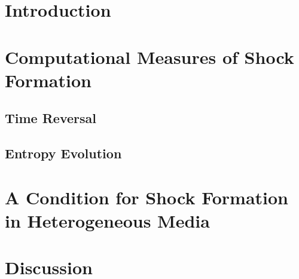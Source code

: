 \documentclass{cmslatex}
\begin{document}
\section{Introduction\label{intro}}


%  

\section{Computational Measures of Shock Formation\label{measures}}
  
  \subsection{Time Reversal}
    
  \subsection{Entropy Evolution}
    

\section{A Condition for Shock Formation in Heterogeneous Media\label{criterion}}
    

\section{Discussion\label{discussion}}
  


\end{document}
